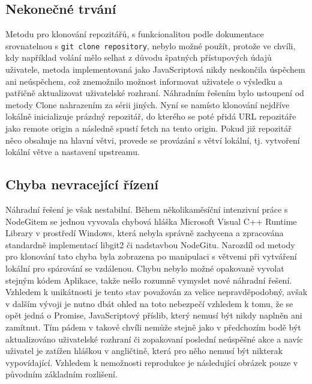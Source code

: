 \subsection{Nekonečné trvání}

Metodu pro klonování repozitářů, s funkcionalitou podle dokumentace srovnatelnou s \texttt{git clone repository}, nebylo možné použít, protože ve chvíli, kdy například volání mělo selhat z důvodu špatných přístupových údajů uživatele, metoda implementovaná jako JavaScriptová  nikdy neskončila úspěchem ani neúspěchem, což znemožnilo možnost informovat uživatele o výsledku a patřičně aktualizovat uživatelské rozhraní. Náhradním řešením bylo ustoupení od metody Clone nahrazením za sérii jiných. Nyní se namísto klonování nejdříve lokálně inicializuje prázdný repozitář, do kterého se poté přidá URL repozitáře jako remote origin a následně spustí fetch na tento origin. Pokud již repozitář něco obsahuje na hlavní větvi, provede se provázání s větví lokální, tj. vytvoření lokální větve a nastavení upstreamu.

\subsection{Chyba nevracející řízení}

Náhradní řešení je však nestabilní. Během několikaměsíční intenzivní práce s NodeGitem se jednou vyvovala chybová hláška Microsoft Visual C++ Runtime Library v prostředí Windows, která nebyla správně zachycena a zpracována standardně implementací libgit2 či nadstavbou NodeGitu. Narozdíl od metody pro klonování tato chyba byla zobrazena po manipulaci s větvemi při vytváření lokální pro spárování se vzdálenou. Chybu nebylo možné opakovaně vyvolat stejným kódem Aplikace, takže nešlo rozumně vymyslet nové náhradní řešení. Vzhledem k unikátnosti je tento stav považován za velice nepravděpodobný, avšak v dalším vývoji je nutno dbát ohled na toto nebezpečí vzhledem k tomu, že se opět jedná o Promise, JavaScriptový příslib, který nemusí být nikdy naplněn ani zamítnut. Tím pádem v takové chvíli nemůže stejně jako v předchozím bodě být aktualizováno uživatelské rozhraní či zopakovaní poslední neúspěšné akce a navíc uživatel je zatížen hláškou v angličtině, která pro něho nemusí být nikterak vypovídající. Vzhledem k nemožnosti reprodukce je následující obrázek pouze v původním základním rozlišení.

